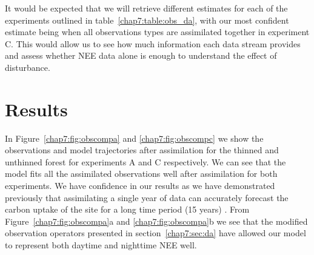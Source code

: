 It would be expected that we will retrieve different estimates for each of the experiments outlined in table~\ref{chap7:table:obs_da}, with our most confident estimate being when all observations types are assimilated together in experiment C. This would allow us to see how much information each data stream provides and assess whether NEE data alone is enough to understand the effect of disturbance.

\section{Results} \label{chap7:sec:results}

In Figure~\ref{chap7:fig:obscompa} and \ref{chap7:fig:obscompc} we show the observations and model trajectories after assimilation for the  thinned and unthinned forest for experiments A and C respectively. We can see that the model fits all the assimilated observations well after assimilation for both experiments. We have confidence in our results as we have demonstrated previously that assimilating a single year of data can accurately forecast the carbon uptake of the site for a long time period (15 years) \citep{Pinnington2016299}. From Figure~\ref{chap7:fig:obscompa}a and \ref{chap7:fig:obscompa}b we see that the modified observation operators presented in section~\ref{chap7:sec:da} have allowed our model to represent both daytime and nighttime NEE well. 

